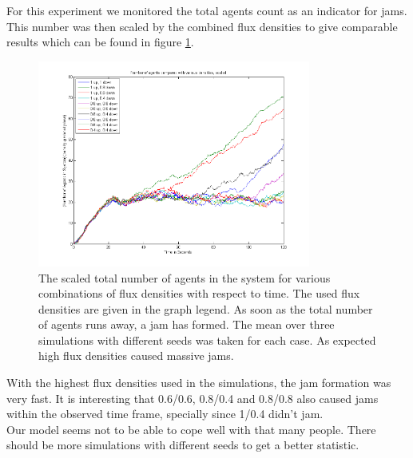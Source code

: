 
\noi For this experiment we monitored the total agents count as an indicator for jams. This number was then scaled by the combined flux densities to give comparable results which can be found in figure \ref{fig:AAllAveragesScaled}.\\
\begin{figure}[h!]
	\centering
		\includegraphics[width=0.80\textwidth]{pictures/AAllAveragesScaled.png}
	\caption{The scaled total number of agents in the system for various combinations of flux densities with respect to time. The used flux densities are given in the graph legend. As soon as the total number of agents runs away, a jam has formed. The mean over three simulations with different seeds was taken for each case. As expected high flux densities caused massive jams.}
	\label{fig:AAllAveragesScaled}
\end{figure}

\noi With the highest flux densities used in the simulations, the jam formation was very fast. It is interesting that 0.6/0.6, 0.8/0.4 and 0.8/0.8 also caused jams within the observed time frame, specially since 1/0.4 didn't jam.\\
Our model seems not to be able to cope well with that many people. There should be more simulations with different seeds to get a better statistic.\\

